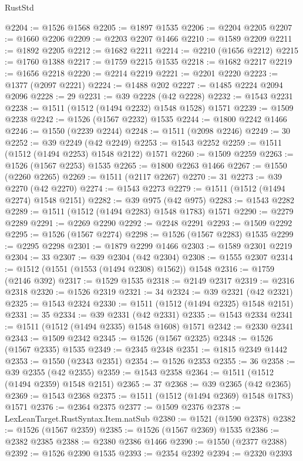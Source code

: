 \begin{lexlean}{RustStd}
\begin{coremodule}
{{@2204 := @1526 @1568
@2205 := @1897 @1535
@2206 := @2204 @2205
@2207 := @1660 @2206
@2209 := @2203 @2207 @1466
@2210 := @1589 @2209
@2211 := @1892 @2205
@2212 := @1682 @2211
@2214 := @2210 (@1656 @2212)
@2215 := @1760 @1388
@2217 := @1759 @2215 @1535
@2218 := @1682 @2217
@2219 := @1656 @2218
@2220 := @2214 @2219
@2221 := @2201 @2220
@2223 := @1377 (@2097 @2221)
@2224 := @1488 @202
@2227 := @1485 @2224 @2094 @2096
@2228 := 29
@2231 := @39 @2228 (@42 @2228)
@2232 := @1543 @2231
@2238 := @1511 (@1512 (@1494 @2232) @1548 @1528) @1571
@2239 := @1509 @2238
@2242 := @1526 (@1567 @2232) @1535
@2244 := @1800 @2242 @1466
@2246 := @1550 (@2239 @2244)
@2248 := @1511 (@2098 @2246)
@2249 := 30
@2252 := @39 @2249 (@42 @2249)
@2253 := @1543 @2252
@2259 := @1511 (@1512 (@1494 @2253) @1548 @2122) @1571
@2260 := @1509 @2259
@2263 := @1526 (@1567 @2253) @1535
@2265 := @1800 @2263 @1466
@2267 := @1550 (@2260 @2265)
@2269 := @1511 (@2117 @2267)
@2270 := 31
@2273 := @39 @2270 (@42 @2270)
@2274 := @1543 @2273
@2279 := @1511 (@1512 (@1494 @2274) @1548 @2151)
@2282 := @39 @975 (@42 @975)
@2283 := @1543 @2282
@2289 := @1511 (@1512 (@1494 @2283) @1548 @1783) @1571
@2290 := @2279 @2289
@2291 := @2269 @2290
@2292 := @2248 @2291
@2293 := @1509 @2292
@2295 := @1526 (@1567 @2274)
@2298 := @1526 (@1567 @2283) @1535
@2299 := @2295 @2298
@2301 := @1879 @2299 @1466
@2303 := @1589 @2301 @2219
@2304 := 33
@2307 := @39 @2304 (@42 @2304)
@2308 := @1555 @2307
@2314 := @1512 (@1551 (@1553 (@1494 @2308) @1562)) @1548
@2316 := @1759 (@2146 @392)
@2317 := @1529 @1535
@2318 := @2149 @2317
@2319 := @2316 @2318
@2320 := @1526 @2319
@2321 := 34
@2324 := @39 @2321 (@42 @2321)
@2325 := @1543 @2324
@2330 := @1511 (@1512 (@1494 @2325) @1548 @2151)
@2331 := 35
@2334 := @39 @2331 (@42 @2331)
@2335 := @1543 @2334
@2341 := @1511 (@1512 (@1494 @2335) @1548 @1608) @1571
@2342 := @2330 @2341
@2343 := @1509 @2342
@2345 := @1526 (@1567 @2325)
@2348 := @1526 (@1567 @2335) @1535
@2349 := @2345 @2348
@2351 := @1815 @2349 @1442
@2353 := @1550 (@2343 @2351)
@2354 := @1526 @2353
@2355 := 36
@2358 := @39 @2355 (@42 @2355)
@2359 := @1543 @2358
@2364 := @1511 (@1512 (@1494 @2359) @1548 @2151)
@2365 := 37
@2368 := @39 @2365 (@42 @2365)
@2369 := @1543 @2368
@2375 := @1511 (@1512 (@1494 @2369) @1548 @1783) @1571
@2376 := @2364 @2375
@2377 := @1509 @2376
@2378 := LexLeanTarget.RustSyntax.Item.natSub
@2380 := @1521 (@1590 @2378)
@2382 := @1526 (@1567 @2359)
@2385 := @1526 (@1567 @2369) @1535
@2386 := @2382 @2385
@2388 := @2380 @2386 @1466
@2390 := @1550 (@2377 @2388)
@2392 := @1526 @2390 @1535
@2393 := @2354 @2392
@2394 := @2320 @2393
}}
\end{coremodule}
\end{lexlean}

